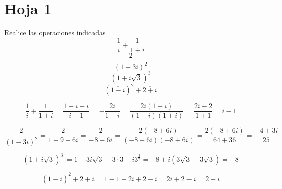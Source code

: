 
\section{Hoja 1}
%
\begin{problem}[1]
Realice las operaciones indicadas
\ppart
\[\frac{1}{i}+\frac{1}{1+i}\]
\ppart
\[\frac{2}{(1-3i)^2}\]
\ppart
\[(1+i\sqrt{3})^3\]
\ppart
\[(\overline{1-i})^2+\overline{2+i}\]

\solution

\spart
\[\frac{1}{i}+\frac{1}{1+i} = \frac{1+i+i}{i-1} = -\frac{2i}{1-i} = \frac{2i(1+i)}{(1-i)(1+i)} = \frac{2i-2}{1+1}=i-1\]

\spart
\[\frac{2}{(1-3i)^2} = \frac{2}{1-9-6i} = \frac{2}{-8-6i}=\frac{2(-8+6i)}{(-8-6i)(-8+6i)} = \frac{2(-8+6i)}{64+36} = \frac{-4+3i}{25}\]

\newpage
\spart
\[(1+i\sqrt{3})^3\ = 1 +3i\sqrt{3}-3\cdot 3-i3^{\frac{3}{2}} = -8 +i (3\sqrt{3}-3\sqrt{3}) = -8\]

\spart
\[(\overline{1-i})^2+\overline{2+i} = \overline{1-1-2i}+2-i = 2i+2-i=2+i\]
\end{problem}

